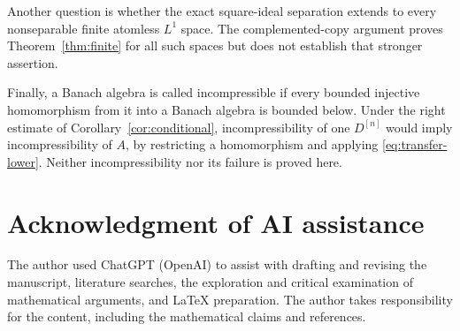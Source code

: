 \documentclass[11pt,reqno]{amsart}
\theoremstyle{definition}
\theoremstyle{remark}
\begin{document}
Another question is whether the exact square-ideal separation extends to every nonseparable finite atomless $L^1$ space. The complemented-copy argument proves Theorem~\ref{thm:finite} for all such spaces but does not establish that stronger assertion.

Finally, a Banach algebra is called incompressible if every bounded injective homomorphism from it into a Banach algebra is bounded below. Under the right estimate of Corollary~\ref{cor:conditional}, incompressibility of one $D^{[n]}$ would imply incompressibility of $A$, by restricting a homomorphism and applying \eqref{eq:transfer-lower}. Neither incompressibility nor its failure is proved here.

\section*{Acknowledgment of AI assistance}
The author used ChatGPT (OpenAI) to assist with drafting and revising the manuscript, literature searches, the exploration and critical examination of mathematical arguments, and LaTeX preparation. The author takes responsibility for the content, including the mathematical claims and references.
\end{document}
